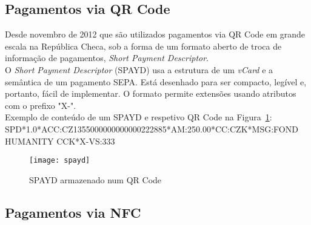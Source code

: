 \subsection{Pagamentos via QR Code} \label{qrcode} 

Desde novembro de 2012 que são utilizados pagamentos via QR Code em grande escala na República Checa, sob a forma de um formato aberto de troca de informação de pagamentos, \textit{Short Payment Descriptor}.\cite{qrplatba} 
\\O \textit{Short Payment Descriptor} (SPAYD) usa a estrutura de um \textit{vCard} e a semântica de um pagamento SEPA. Está desenhado para ser compacto, legível e, portanto, fácil de implementar. O formato permite extensões usando atributos com o prefixo "X-".
\\Exemplo de conteúdo de um SPAYD e respetivo QR Code na Figura~\ref{fig:spayd}: 
\\SPD*1.0*ACC:CZ1355000000000000222885*AM:250.00*CC:CZK*MSG:FOND HUMANITY CCK*X-VS:333

\begin{figure}[t]
  \begin{center}
    \leavevmode
    \texttt{[image: spayd]}
    \caption{SPAYD armazenado num QR Code}
    \label{fig:spayd}
  \end{center}
\end{figure}

\subsection{Pagamentos via NFC} \label{nfc} 

